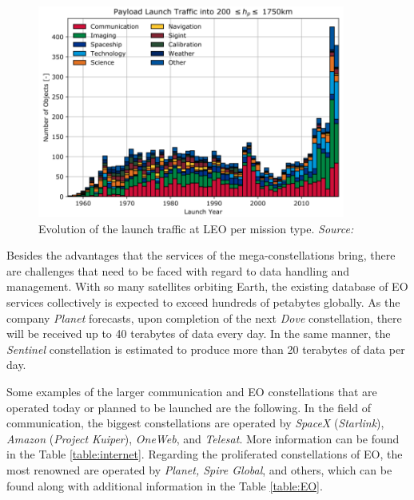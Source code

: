\begin{figure}
\centering
\includegraphics[width=0.9\textwidth]{Images/launch_traffic_type_LEO.png}\caption{Evolution of the launch traffic at LEO per mission type. \textit{Source: \cite{ESA 2019}}}
\label{launch_traffic_type_LEO} 
\end{figure} 

Besides the advantages that the services of the mega-constellations bring, there are challenges that need to be faced with regard to data handling and management. With so many satellites orbiting Earth, the existing database of EO services collectively is expected to exceed hundreds of petabytes globally. As the company \textit{Planet} forecasts, upon completion of the next \textit{Dove} constellation, there will be received up to 40 terabytes of data every day. In the same manner, the \textit{Sentinel} constellation is estimated to produce more than 20 terabytes of data per day. \cite{LE_Esteve}

Some examples of the larger communication and EO constellations that are operated today or planned to be launched are the following. In the field of communication, the biggest constellations are operated by \textit{SpaceX} (\textit{Starlink}), \textit{Amazon} (\textit{Project Kuiper}), \textit{OneWeb}, and \textit{Telesat}. More information can be found in the Table \ref{table:internet}. Regarding the proliferated constellations of EO, the most renowned are operated by \textit{Planet, Spire Global}, and others, which can be found along with additional information in the Table \ref{table:EO}.



